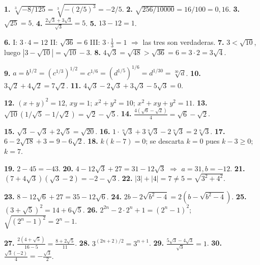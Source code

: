 \documentclass[11pt, letterpaper]{article}
\begin{document}
\medskip

\begin{tcolorbox}[answerbox, title={Desarrollos clave}]
\small

\noindent\textbf{1.} $\sqrt[3]{-8/125}=\sqrt[3]{-(2/5)^3}=-2/5$. \quad
\textbf{2.} $\sqrt{256/10000}=16/100=0{,}16$. \quad
\textbf{3.} $\sqrt{25}=5$. \quad
\textbf{4.} $\frac{2\sqrt3+3\sqrt3}{\sqrt3}=5$. \quad
\textbf{5.} $13-12=1$.

\medskip

\noindent\textbf{6.} I: $3\cdot4=12$ \checkmark{}\;  II: $\sqrt{36}=6$ \checkmark{}\;  III: $3\cdot\tfrac{1}{3}=1$ \checkmark{}\; $\Rightarrow$ las tres son verdaderas. \quad
\textbf{7.} $3<\sqrt{10}$, luego $|3-\sqrt{10}|=\sqrt{10}-3$. \quad
\textbf{8.} $4\sqrt{3}=\sqrt{48}>\sqrt{36}=6=3\cdot2=3\sqrt{4}$.

\medskip

\noindent\textbf{9.} $a=b^{1/2}=(c^{1/3})^{1/2}=c^{1/6}=(d^{1/5})^{1/6}=d^{1/30}=\sqrt[30]{d}$. \quad
\textbf{10.} $3\sqrt2+4\sqrt2=7\sqrt2$. \quad
\textbf{11.} $4\sqrt3-2\sqrt3+3\sqrt3-5\sqrt3=0$.

\medskip

\noindent\textbf{12.} $(x+y)^2=12$, $xy=1$; $x^2+y^2=10$; $x^2+xy+y^2=11$. \quad
\textbf{13.} $\sqrt{10}(1/\sqrt5-1/\sqrt2)=\sqrt2-\sqrt5$. \quad
\textbf{14.} $\frac{4(\sqrt6-\sqrt2)}{4}=\sqrt6-\sqrt2$.

\medskip

\noindent\textbf{15.} $\sqrt3-\sqrt3+2\sqrt5=\sqrt{20}$. \quad
\textbf{16.} $1\cdot\sqrt[n]3+3\sqrt[n]3-2\sqrt[n]3=2\sqrt[n]3$. \quad
\textbf{17.} $6-2\sqrt{18}+3=9-6\sqrt2$. \quad
\textbf{18.} $k(k-7)=0$; se descarta $k=0$ pues $k-3\geq0$; $k=7$.

\medskip

\noindent\textbf{19.} $2-45=-43$. \quad
\textbf{20.} $4-12\sqrt3+27=31-12\sqrt3$ $\Rightarrow$ $a=31,b=-12$. \quad
\textbf{21.} $(7+4\sqrt3)(\sqrt3-2)=-2-\sqrt3$. \quad
\textbf{22.} $|3|+|4|=7\neq5=\sqrt{3^2+4^2}$.

\medskip

\noindent\textbf{23.} $8-12\sqrt6+27=35-12\sqrt6$. \quad
\textbf{24.} $2b-2\sqrt{b^2-4}=2(b-\sqrt{b^2-4})$. \quad
\textbf{25.} $(3+\sqrt5)^2=14+6\sqrt5$. \quad
\textbf{26.} $2^{2n}-2\cdot2^n+1=(2^n-1)^2$; $\sqrt{(2^n-1)^2}=2^n-1$.

\medskip

\noindent\textbf{27.} $\frac{2(4+\sqrt5)}{16-5}=\frac{8+2\sqrt5}{11}$. \quad
\textbf{28.} $3^{(2n+2)/2}=3^{n+1}$. \quad
\textbf{29.} $\frac{5\sqrt3-4\sqrt3}{\sqrt3}=1$. \quad
\textbf{30.} $\frac{\sqrt3(-2)}{4}=-\frac{\sqrt3}{2}$.


\end{tcolorbox}
\end{document}
